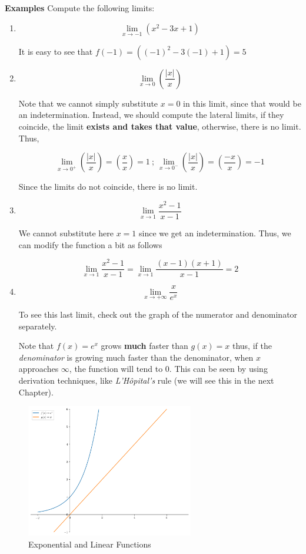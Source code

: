 \documentclass[a4paper,11pt]{article}
\theoremstyle{definition}
\theoremstyle{plain}
\begin{document}
\textbf{Examples} Compute the following limits: 
\begin{enumerate}
	\item 
	\[
	\lim_{x\rightarrow -1} \left(x^2-3x +1\right)
	\] 

	It is easy to see that \(f(-1) = \left((-1)^2-3(-1) +1\right) = 5\) 

	\item 
	\[
	\lim_{x\rightarrow 0} \left(\frac{\lvert x \rvert}{x}\right)
	\] 

	Note that we cannot simply substitute \(x=0\) in this limit, since that would
be an indetermination. Instead, we should compute the lateral limits, if
they coincide, the limit \textbf{exists and takes that value},
otherwise, there is no limit. Thus, 

\[
\lim_{x\rightarrow 0^+} \left(\frac{\lvert x \rvert}{x}\right) = \left(\frac{x}{x}\right) = 1 \ ; \ \lim_{x\rightarrow 0^-} \left(\frac{\lvert x \rvert}{x}\right) = \left(\frac{-x}{x}\right) = -1
\] 

Since the limits do not coincide, there is no limit. 

	\item 
	\[
	\lim_{x\rightarrow 1} \frac{x^2-1}{x-1}
	\] 

	We cannot substitute here \(x = 1\) since we get an indetermination. Thus, we can modify the
function a bit as follows 

	\[
	\lim_{x\rightarrow 1} \frac{x^2-1}{x-1} = \lim_{x\rightarrow 1} \frac{(x-1)(x+1)}{x-1} = 2
	\] 

	\item  
	\[
	\lim_{x\rightarrow +\infty}\frac{x}{e^x}
	\]

To see this last limit, check out the graph of the numerator and
denominator separately.

Note that \(f(x) = e^x\) grows \textbf{much} faster than \(g(x) = x\)
thus, if the \emph{denominator} is growing much faster than the
denominator, when \(x\) approaches \(\infty\), the function will tend to
\(0\). This can be seen by using derivation techniques, like
\emph{L'H\^opital's} rule (we will see this in the next Chapter).

\end{enumerate}	

    \begin{figure}[htbp]
    	\centering 
    		\includegraphics[width = 0.65\textwidth]{Ch1_files/Ch1_23_0.png}
    		\caption{Exponential and Linear Functions}
    		\label{fig:exp_vs_linear}
    \end{figure}
    
\end{document}
